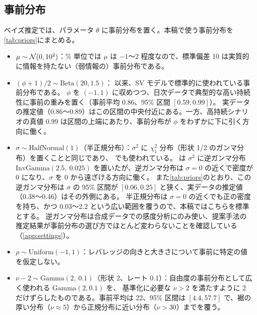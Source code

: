\subsection{事前分布}\label{sec:model-prior}

ベイズ推定では、パラメータ $\theta$ に事前分布を置く。本稿で使う事前分布を\cref{tab:priors}にまとめる。

\begin{table}[tbp]
  \centering
  \caption{事前分布と、その平均・95\% 区間（2.5\%・97.5\% 点）。$\sigma$ の事前分布は半正規分布を標準とし、逆ガンマ分布（$\sigma^2$ に対する）は感度分析（\cref{app:settings}）でのみ使う。}
  \label{tab:priors}
  \small
  
\end{table}

\begin{itemize}
  \item $\mu \sim \mathcal{N}(0, 10^2)$：\% 単位では $\mu$ は $-1$〜$2$ 程度なので、標準偏差 10 は実質的に情報を持たない（弱情報の）事前分布である。
  \item $(\phi + 1)/2 \sim \mathrm{Beta}(20, 1.5)$：\textcite{kim1998} 以来、SV モデルで標準的に使われている事前分布である。
    $\phi$ を $(-1, 1)$ に収めつつ、日次データで典型的な高い持続性に事前の重みを置く（事前平均 0.86、95\% 区間 $[0.59, 0.99]$）。
    実データの推定値（0.86〜0.89）はこの区間の中央付近にある。一方、高持続シナリオの真値 0.99 は区間の上端にあたり、事前分布が $\phi$ をわずかに下に引く方向に働く。
  \item $\sigma \sim \mathrm{HalfNormal}(1)$（半正規分布）：$\sigma^2$ に $\chi^2_1$ 分布（形状 1/2 のガンマ分布）を置くことと同じであり、
    \textcite{kastner2014} でも使われている。
    \textcite{kim1998} は $\sigma^2$ に逆ガンマ分布 $\mathrm{InvGamma}(2.5,\ 0.025)$ を置いたが、逆ガンマ分布は $\sigma = 0$ の近くで密度が 0 になり、$\sigma$ を 0 から遠ざける方向に働く。
    また\cref{tab:priors}のとおり、この逆ガンマ分布は $\sigma$ の 95\% 区間が $[0.06, 0.25]$ と狭く、実データの推定値（0.38〜0.46）はその外側にある。
    半正規分布は $\sigma = 0$ の近くでも正の密度を持ち、かつ 0.03〜2.2 という広い範囲を覆うので、本稿ではこちらを標準とする。
    逆ガンマ分布は合成データでの感度分析にのみ使い、提案手法の推定結果が事前分布の選び方でほとんど変わらないことを確認している（\cref{app:settings}）。
  \item $\rho \sim \mathrm{Uniform}(-1, 1)$：レバレッジの向きと大きさについて事前に特定の値を仮定しない。
  \item $\nu - 2 \sim \mathrm{Gamma}(2,\ 0.1)$（形状 2、レート 0.1）：自由度の事前分布として広く使われる $\mathrm{Gamma}(2, 0.1)$ \parencite{juarez2010} を、
    基準化に必要な $\nu > 2$ を満たすように 2 だけずらしたものである。事前平均は 22、95\% 区間は $[4.4, 57.7]$ で、裾の厚い分布（$\nu \approx 5$）から正規分布に近い分布（$\nu > 30$）までを覆う。
\end{itemize}

